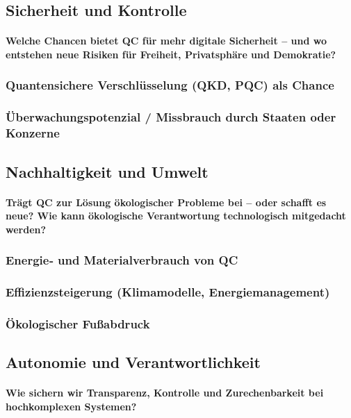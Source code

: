 \subsection{Sicherheit und Kontrolle}
\paragraph{Welche Chancen bietet QC für mehr digitale Sicherheit – und wo entstehen neue Risiken für Freiheit, Privatsphäre und Demokratie?}

\subsubsection{Quantensichere Verschlüsselung (QKD, PQC) als Chance}
\subsubsection{Überwachungspotenzial / Missbrauch durch Staaten oder Konzerne}

\subsection{Nachhaltigkeit und Umwelt}
\paragraph{Trägt QC zur Lösung ökologischer Probleme bei – oder schafft es neue? 
Wie kann ökologische Verantwortung technologisch mitgedacht werden?
}

\subsubsection{Energie‑ und Materialverbrauch von QC}
\subsubsection{Effizienzsteigerung (Klimamodelle, Energiemanagement)}
\subsubsection{Ökologischer Fußabdruck}

\subsection{Autonomie und Verantwortlichkeit}
\paragraph{Wie sichern wir Transparenz, Kontrolle und Zurechenbarkeit bei hochkomplexen Systemen?}

